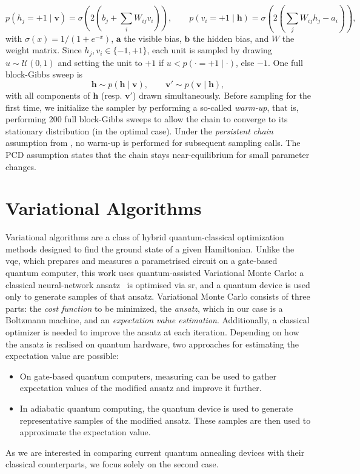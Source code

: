 \documentclass[10pt,a4paper]{article}
\numberwithin{equation}{section}
\begin{document}
\begin{equation}
  p(h_j = +1 \mid \mathbf{v}) = \sigma\!\left(2\left(b_j + \sum_{i} W_{ij}
  v_i\right)\right), \qquad
  p(v_i = +1 \mid \mathbf{h}) = \sigma\!\left(2\left(\sum_{j} W_{ij} h_j -
  a_i\right)\right),
\end{equation}
with $\sigma(x) = 1/(1+e^{-x})$, $\mathbf{a}$ the visible bias, $\mathbf{b}$ the hidden bias, and $W$ the weight matrix. Since $h_j, v_i \in \{-1,+1\}$, each unit is sampled by drawing $u \sim \mathcal{U}(0,1)$ and setting the unit to $+1$ if $u < p(\cdot=+1\mid\cdot)$, else $-1$.                                          
One full block-Gibbs sweep is                                                                      
\begin{equation}
  \mathbf{h} \sim p(\mathbf{h}\mid\mathbf{v}), \qquad \mathbf{v}' \sim
  p(\mathbf{v}\mid\mathbf{h}),
\end{equation}                                                                                                                                         
with all components of $\mathbf{h}$ (resp. $\mathbf{v}'$) drawn simultaneously. Before sampling for the first time, we initialize the sampler by performing a so-called \textit{warm-up}, that is, performing 200 full block-Gibbs sweeps to allow the chain to converge to its stationary distribution (in the optimal case). Under the \textit{persistent chain} assumption from \cite{PhysRevResearch.2.023266}, no warm-up is performed for subsequent sampling calls. The PCD assumption states that the chain stays near-equilibrium for small parameter changes.
\section{Variational Algorithms}
Variational algorithms are a class of hybrid quantum-classical optimization methods designed to find the ground state of a given Hamiltonian. Unlike the \acrfull{vqe}, which prepares and measures a parametrised circuit on a gate-based quantum computer, this work uses quantum-assisted Variational Monte Carlo: a classical neural-network ansatz~\cite{Carleo_2017} is optimised via \gls{sr}, and a quantum device is used only to generate samples of that ansatz. Variational Monte Carlo consists of three parts: the \textit{cost function} to be minimized, the \textit{ansatz}, which in our case is a Boltzmann machine, and an \textit{expectation value estimation}. Additionally, a classical optimizer is needed to improve the ansatz at each iteration. Depending on how the ansatz is realised on quantum hardware, two approaches for estimating the expectation value are possible:
\begin{itemize}
	\item On gate-based quantum computers, measuring can be used to gather expectation values of the modified ansatz and improve it further.
	\item In adiabatic quantum computing, the quantum device is used to generate representative samples of the modified ansatz. These samples are then used to approximate the expectation value. 
\end{itemize}
As we are interested in comparing current quantum annealing devices with their classical counterparts, we focus solely on the second case. 
\end{document}
